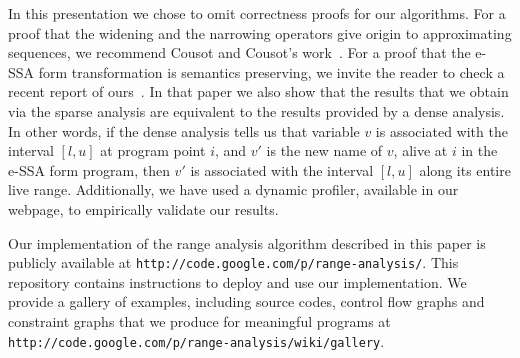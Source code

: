 \documentclass[preprint]{elsarticle}
\begin{document}
In this presentation we chose to omit correctness proofs for our algorithms.
For a proof that the widening and the narrowing operators give origin to
approximating sequences, we recommend Cousot and Cousot's work~\cite{Cousot77}.
For a proof that the e-SSA form transformation is semantics preserving, we
invite the reader to check a recent report of ours~\cite{Tavares11b}.
In that paper we also show that the results that we obtain via the
sparse analysis are equivalent to the results provided by a dense analysis.
In other words, if the dense analysis tells us that variable $v$ is
associated with the interval $[l, u]$ at program point $i$, and $v'$
is the new name of $v$, alive at $i$ in the e-SSA form program, then $v'$ is
associated with the interval $[l, u]$ along its entire live range.
Additionally, we have used a dynamic profiler, available in our webpage, to
empirically validate our results.

Our implementation of the range analysis algorithm described in this paper is
publicly available at \texttt{http://code.google.com/p/range-analysis/}.
This repository contains instructions to deploy and use our
implementation.
We provide a gallery of examples, including source codes,
control flow graphs and constraint graphs that we produce for meaningful
programs at \\ \texttt{http://code.google.com/p/range-analysis/wiki/gallery}.



\end{document}
